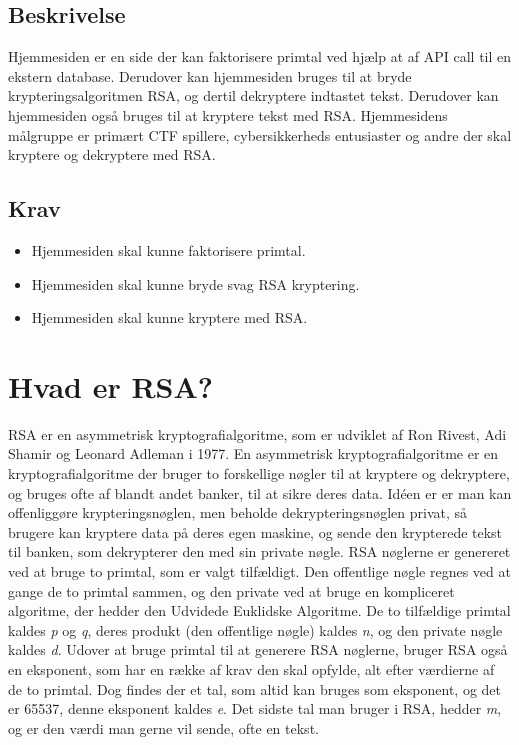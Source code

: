 \documentclass[a4paper,12pt]{extarticle}
\begin{document}
    \subsection{Beskrivelse}\label{subsec:beskrivelse}
    Hjemmesiden er en side der kan faktorisere primtal ved hjælp at af API call til en ekstern database.
    Derudover kan hjemmesiden bruges til at bryde krypteringsalgoritmen RSA, og dertil dekryptere indtastet tekst.
    Derudover kan hjemmesiden også bruges til at kryptere tekst med RSA. Hjemmesidens målgruppe er primært CTF
    spillere, cybersikkerheds entusiaster og andre der skal kryptere og dekryptere med RSA\@.

    \subsection{Krav}\label{subsec:krav}
    \begin{itemize}
        \item Hjemmesiden skal kunne faktorisere primtal.
        \item Hjemmesiden skal kunne bryde svag RSA kryptering.
        \item Hjemmesiden skal kunne kryptere med RSA\@.
    \end{itemize}



    \section{Hvad er RSA?}\label{sec:hvad-er-rsa}
    RSA er en asymmetrisk kryptografialgoritme, som er udviklet af Ron Rivest, Adi Shamir og Leonard Adleman i 1977.
    En asymmetrisk kryptografialgoritme er en kryptografialgoritme der bruger to forskellige nøgler til at kryptere og dekryptere,
    og bruges ofte af blandt andet banker, til at sikre deres data.
    Idéen er er man kan offenliggøre krypteringsnøglen, men beholde dekrypteringsnøglen privat, så brugere kan kryptere data på deres egen maskine,
    og sende den krypterede tekst til banken, som dekrypterer den med sin private nøgle.
    RSA nøglerne er genereret ved at bruge to primtal, som er valgt tilfældigt.
    Den offentlige nøgle regnes ved at gange de to primtal sammen, og den private ved at bruge en kompliceret algoritme,
    der hedder den Udvidede Euklidske Algoritme.\@
    De to tilfældige primtal kaldes \emph{p} og \emph{q}, deres produkt (den offentlige nøgle) kaldes \emph{n}, og den private nøgle kaldes \emph{d}.
    Udover at bruge primtal til at generere RSA nøglerne, bruger RSA også en eksponent, som har en række af krav den skal opfylde,
    alt efter værdierne af de to primtal.
    Dog findes der et tal, som altid kan bruges som eksponent, og det er 65537, denne eksponent kaldes \emph{e}.
    Det sidste tal man bruger i RSA, hedder \emph{m}, og er den værdi man gerne vil sende, ofte en tekst.\@
\end{document}
